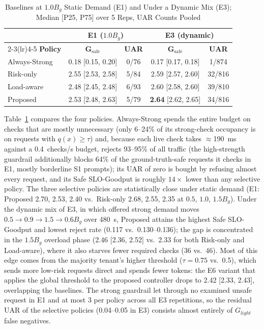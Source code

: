 \documentclass[conference]{IEEEtran}
\newcommand{\Glight}{G_{\mathit{light}}}
\newcommand{\Gsafe}{G_{\mathrm{safe}}}
\newcommand{\Bg}{B_g}
\begin{document}
\begin{table}[t]
\caption{Baselines at $1.0\Bg$ Static Demand (E1) and Under a Dynamic Mix (E3); Median [P25, P75] over 5 Reps, UAR Counts Pooled}
\label{tab:e1e3}
\centering
\scriptsize
\setlength{\tabcolsep}{3pt}
\begin{tabular}{lcccc}
\toprule
 & \multicolumn{2}{c}{\textbf{E1 ($1.0\Bg$)}} & \multicolumn{2}{c}{\textbf{E3 (dynamic)}} \\
\cmidrule(lr){2-3}\cmidrule(lr){4-5}
\textbf{Policy} & $\boldsymbol{\Gsafe}$ & \textbf{UAR} & $\boldsymbol{\Gsafe}$ & \textbf{UAR} \\
\midrule
Always-Strong & 0.18 [0.15, 0.20] & 0/76 & 0.17 [0.17, 0.18] & 1/874 \\
Risk-only & 2.55 [2.53, 2.58] & 5/84 & 2.59 [2.57, 2.60] & 32/816 \\
Load-aware & 2.48 [2.45, 2.48] & 6/93 & 2.60 [2.58, 2.60] & 39/810 \\
Proposed & 2.53 [2.48, 2.63] & 5/79 & \textbf{2.64} [2.62, 2.65] & 34/816 \\
\bottomrule
\end{tabular}
\end{table}

Table~\ref{tab:e1e3} compares the four policies. Always-Strong spends the entire budget on checks that are mostly unnecessary (only 6--24\% of its strong-check occupancy is on requests with $q(x) \ge \tau$) and, because each live check takes $\approx$190~ms against a 0.4~checks/s budget, rejects 93--95\% of all traffic (the high-strength guardrail additionally blocks 64\% of the ground-truth-safe requests it checks in E1, mostly borderline S1 prompts); its UAR of zero is bought by refusing almost every request, and its Safe SLO-Goodput is roughly $14\times$ lower than any selective policy. The three selective policies are statistically close under static demand (E1: Proposed 2.70, 2.53, 2.40 vs.\ Risk-only 2.68, 2.55, 2.35 at $0.5$, $1.0$, $1.5\Bg$). Under the dynamic mix of E3, in which offered strong demand moves $0.5 \to 0.9 \to 1.5 \to 0.6\Bg$ over 480~s, Proposed attains the highest Safe SLO-Goodput and lowest reject rate (0.117 vs.\ 0.130--0.136); the gap is concentrated in the $1.5\Bg$ overload phase (2.46 [2.36, 2.52] vs.\ 2.33 for both Risk-only and Load-aware), where it also starves fewer required checks (36 vs.\ 46). Most of this edge comes from the majority tenant's higher threshold ($\tau{=}0.75$ vs.\ 0.5), which sends more low-risk requests direct and spends fewer tokens: the E6 variant that applies the global threshold to the proposed controller drops to 2.42 [2.33, 2.43], overlapping the baselines. The strong guardrail let through no examined unsafe request in E1 and at most 3 per policy across all E3 repetitions, so the residual UAR of the selective policies (0.04--0.05 in E3) consists almost entirely of $\Glight$ false negatives.
\end{document}
